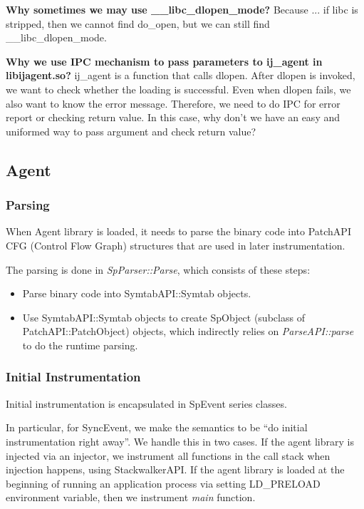 \textbf{Why sometimes we may use \_\_libc\_dlopen\_mode?} Because ... if libc is
stripped, then we cannot find do\_open, but we can still find
\_\_libc\_dlopen\_mode.


\textbf{Why we use IPC mechanism to pass parameters to ij\_agent in
  libijagent.so?}  ij\_agent is a function that calls dlopen. After dlopen is
invoked, we want to check whether the loading is successful. Even when dlopen
fails, we also want to know the error message. Therefore, we need to do IPC for
error report or checking return value. In this case, why don't we have an easy
and uniformed way to pass argument and check return value?

\subsection{Agent}
\subsubsection{Parsing}

When Agent library is loaded, it needs to parse the binary code into PatchAPI
CFG (Control Flow Graph) structures that are used in later instrumentation.

The parsing is done in {\em SpParser::Parse}, which consists of these steps:
\begin{itemize}
\item Parse binary code into SymtabAPI::Symtab objects.
\item Use SymtabAPI::Symtab objects to create SpObject (subclass of
  PatchAPI::PatchObject) objects, which indirectly relies on {\em
    ParseAPI::parse} to do the runtime parsing.
\end{itemize}

\subsubsection{Initial Instrumentation}

Initial instrumentation is encapsulated in SpEvent series classes. 

In particular, for SyncEvent, we make the semantics to be ``do initial
instrumentation right away''. We handle this in two cases. If the agent library
is injected via an injector, we instrument all functions in the call stack when
injection happens, using StackwalkerAPI. If the agent library is loaded at the
beginning of running an application process via setting LD\_PRELOAD environment
variable, then we instrument {\em main} function.


